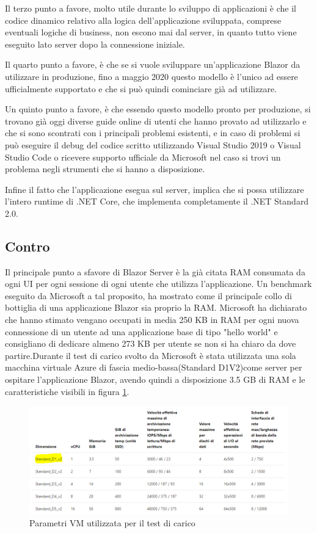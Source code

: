 Il terzo punto a favore, molto utile durante lo sviluppo di applicazioni \`e che il codice dinamico relativo alla logica dell'applicazione sviluppata, comprese eventuali logiche di business, non escono mai dal server, in quanto tutto viene eseguito lato server dopo la connessione iniziale.

Il quarto punto a favore, \`e che se si vuole sviluppare un'applicazione Blazor da utilizzare in produzione, fino a maggio 2020 questo modello \`e l'unico ad essere ufficialmente supportato e che si pu\`o quindi cominciare gi\`a ad utilizzare.

Un quinto punto a favore, \`e che essendo questo modello pronto per produzione, si trovano gi\`a oggi diverse guide online di utenti che hanno provato ad utilizzarlo e che si sono scontrati con i principali problemi esistenti, e in caso di problemi si pu\`o eseguire il debug del codice scritto utilizzando Visual Studio 2019 o Visual Studio Code o ricevere supporto ufficiale da Microsoft nel caso si trovi un problema negli strumenti che si hanno a disposizione.

Infine il fatto che l'applicazione esegua sul server, implica che si possa utilizzare l'intero runtime di .NET Core, che implementa completamente il .NET Standard 2.0.
\subsection{Contro}\label{sez:controBServer}
Il principale punto a sfavore di Blazor Server \`e la gi\`a citata RAM consumata da ogni UI per ogni sessione di ogni utente che utilizza l'applicazione.
Un benchmark eseguito da Microsoft a tal proposito, ha mostrato come il principale collo di bottiglia di una applicazione Blazor sia proprio la RAM.
Microsoft ha dichiarato che hanno stimato vengano occupati in media 250 KB in RAM per ogni nuova connessione di un utente ad una applicazione base di tipo "hello world" e consigliano di dedicare almeno 273 KB per utente se non si ha chiaro da dove partire.Durante il test di carico svolto da Microsoft \`e stata utilizzata una sola macchina virtuale Azure di fascia medio-bassa(Standard D1V2)come server per ospitare l'applicazione Blazor, avendo quindi a disposizione 3.5 GB di RAM e le caratteristiche visibili in figura \ref{fig:vmStandardD1V2}.

\begin{figure}[H]
	\centerline{\includegraphics[scale=0.5]{figure/Standard_D1_V2.PNG}}
	\caption{Parametri VM utilizzata per il test di carico}
	\label{fig:vmStandardD1V2}
\end{figure}

